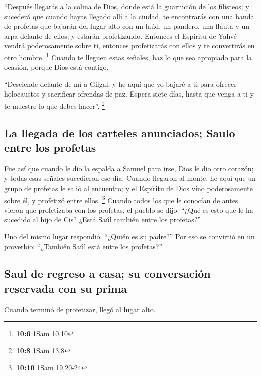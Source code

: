  ``Después llegarás a la colina de Dios, donde está la
guarnición de los filisteos; y sucederá que cuando hayas llegado allí a
la ciudad, te encontrarás con una banda de profetas que bajarán del
lugar alto con un laúd, un pandero, una flauta y un arpa delante de
ellos; y estarán profetizando.  Entonces el Espíritu de
Yahvé vendrá poderosamente sobre ti, entonces profetizarás con ellos y
te convertirás en otro hombre. \footnote{\textbf{10:6} 1Sam 10,10}
 Cuando te lleguen estas señales, haz lo que sea apropiado
para la ocasión, porque Dios está contigo.

 ``Desciende delante de mí a Gilgal; y he aquí que yo
bajaré a ti para ofrecer holocaustos y sacrificar ofrendas de paz.
Espera siete días, hasta que venga a ti y te muestre lo que debes
hacer''. \footnote{\textbf{10:8} 1Sam 13,8}

\hypertarget{la-llegada-de-los-carteles-anunciados-saulo-entre-los-profetas}{%
\subsection{La llegada de los carteles anunciados; Saulo entre los
profetas}\label{la-llegada-de-los-carteles-anunciados-saulo-entre-los-profetas}}

 Fue así que cuando le dio la espalda a Samuel para irse,
Dios le dio otro corazón; y todas esas señales sucedieron ese día.
 Cuando llegaron al monte, he aquí que un grupo de
profetas le salió al encuentro; y el Espíritu de Dios vino poderosamente
sobre él, y profetizó entre ellos. \footnote{\textbf{10:10} 1Sam
  19,20-24}  Cuando todos los que le conocían de antes
vieron que profetizaba con los profetas, el pueblo se dijo: ``¿Qué es
esto que le ha sucedido al hijo de Cis? ¿Está Saúl también entre los
profetas?''

 Uno del mismo lugar respondió: ``¿Quién es su padre?''
Por eso se convirtió en un proverbio: ``¿También Saúl está entre los
profetas?''

\hypertarget{saul-de-regreso-a-casa-su-conversaciuxf3n-reservada-con-su-prima}{%
\subsection{Saul de regreso a casa; su conversación reservada con su
prima}\label{saul-de-regreso-a-casa-su-conversaciuxf3n-reservada-con-su-prima}}

 Cuando terminó de profetizar, llegó al lugar alto.

